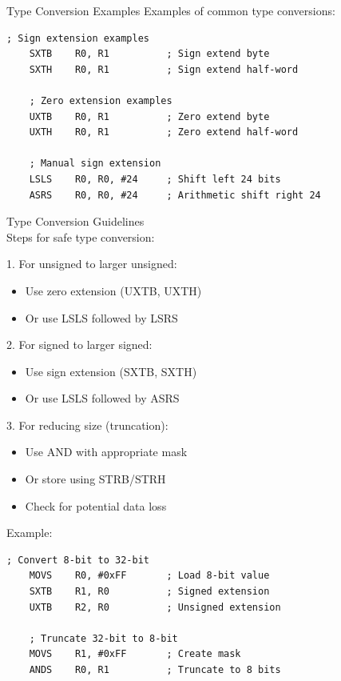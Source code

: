 \begin{example2}{Type Conversion Examples}
Examples of common type conversions:
\begin{lstlisting}[language=armasm, style=basesmol]
    ; Sign extension examples
    SXTB    R0, R1          ; Sign extend byte
    SXTH    R0, R1          ; Sign extend half-word
    
    ; Zero extension examples
    UXTB    R0, R1          ; Zero extend byte
    UXTH    R0, R1          ; Zero extend half-word
    
    ; Manual sign extension
    LSLS    R0, R0, #24     ; Shift left 24 bits
    ASRS    R0, R0, #24     ; Arithmetic shift right 24
\end{lstlisting}
\end{example2}

\begin{KR}{Type Conversion Guidelines}\\
Steps for safe type conversion:

1. For unsigned to larger unsigned:
\begin{itemize}
  \item Use zero extension (UXTB, UXTH)
  \item Or use LSLS followed by LSRS
\end{itemize}

2. For signed to larger signed:
\begin{itemize}
  \item Use sign extension (SXTB, SXTH)
  \item Or use LSLS followed by ASRS
\end{itemize}

3. For reducing size (truncation):
\begin{itemize}
  \item Use AND with appropriate mask
  \item Or store using STRB/STRH
  \item Check for potential data loss
\end{itemize}

Example:
\begin{lstlisting}[language=armasm, style=basesmol]
    ; Convert 8-bit to 32-bit
    MOVS    R0, #0xFF       ; Load 8-bit value
    SXTB    R1, R0          ; Signed extension
    UXTB    R2, R0          ; Unsigned extension
    
    ; Truncate 32-bit to 8-bit
    MOVS    R1, #0xFF       ; Create mask
    ANDS    R0, R1          ; Truncate to 8 bits
\end{lstlisting}
\end{KR}

